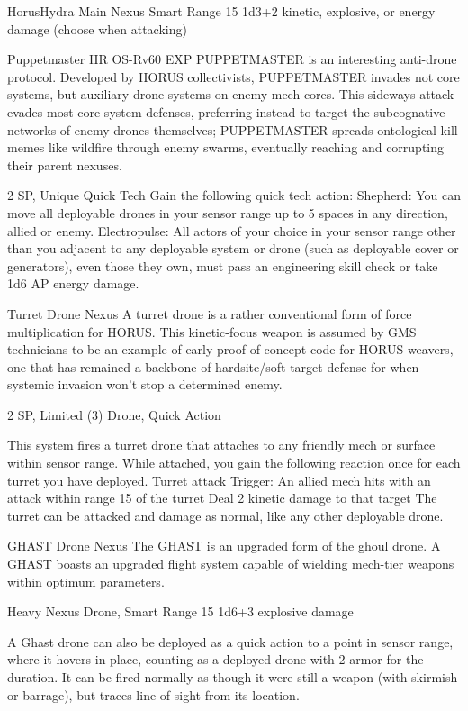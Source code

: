 \begin{mech}{Horus}{Hydra}
Main Nexus
Smart
Range 15
1d3+2 kinetic, explosive, or energy damage (choose when attacking)

Puppetmaster
HR OS-Rv60 EXP PUPPETMASTER is an interesting anti-drone protocol. Developed by HORUS collectivists, PUPPETMASTER invades not core systems, but auxiliary drone systems on enemy mech cores. This sideways attack evades most core system defenses, preferring instead to target the subcognative networks of enemy drones themselves; PUPPETMASTER spreads ontological-kill memes like wildfire through enemy swarms, eventually reaching and corrupting their parent nexuses. 

2 SP, Unique
Quick Tech
Gain the following quick tech action:
Shepherd: You can move all deployable drones in your sensor range up to 5 spaces in any direction, allied or enemy.
Electropulse: All actors of your choice in your sensor range other than you adjacent to any deployable system or drone (such as deployable cover or generators), even those they own, must pass an engineering skill check or take 1d6 AP energy damage.

Turret Drone Nexus
A turret drone is a rather conventional form of force multiplication for HORUS. This kinetic-focus weapon is assumed by GMS technicians to be an example of early proof-of-concept code for HORUS weavers, one that has remained a backbone of hardsite/soft-target defense for when systemic invasion won’t stop a determined enemy. 

2 SP, Limited (3)
Drone, Quick Action

This system fires a turret drone that attaches to any friendly mech or surface within sensor range. While attached, you gain the following reaction once for each turret you have deployed.
	Turret attack
	Trigger: An allied mech hits with an attack within range 15 of the turret
	Deal 2 kinetic damage to that target
The turret can be attacked and damage as normal, like any other deployable drone.

GHAST Drone Nexus
The GHAST is an upgraded form of the ghoul drone. A GHAST boasts an upgraded flight system capable of wielding mech-tier weapons within optimum parameters. 

Heavy Nexus
Drone, Smart
Range 15
1d6+3 explosive damage

A Ghast drone can also be deployed as a quick action to a point in sensor range, where it hovers in place, counting as a deployed drone with 2 armor for the duration. It can be fired normally as though it were still a weapon (with skirmish or barrage), but traces line of sight from its location.


\end{mech}
